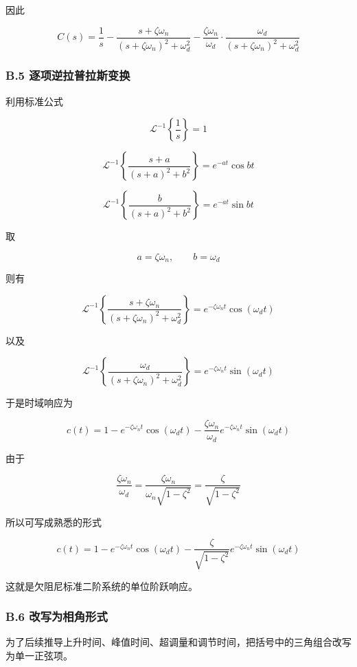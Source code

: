 \documentclass[
  11pt]{article}
\begin{document}
因此

\[
C(s)=\frac{1}{s}
-\frac{s+\zeta\omega_n}{(s+\zeta\omega_n)^2+\omega_d^2}
-\frac{\zeta\omega_n}{\omega_d}\cdot
\frac{\omega_d}{(s+\zeta\omega_n)^2+\omega_d^2}
\]

\subsubsection{B.5
逐项逆拉普拉斯变换}\label{b.5-ux9010ux9879ux9006ux62c9ux666eux62c9ux65afux53d8ux6362}

利用标准公式

\[
\mathcal{L}^{-1}\left\{\frac{1}{s}\right\}=1
\]

\[
\mathcal{L}^{-1}\left\{\frac{s+a}{(s+a)^2+b^2}\right\}=e^{-at}\cos bt
\]

\[
\mathcal{L}^{-1}\left\{\frac{b}{(s+a)^2+b^2}\right\}=e^{-at}\sin bt
\]

取

\[
a=\zeta\omega_n,\qquad b=\omega_d
\]

则有

\[
\mathcal{L}^{-1}\left\{
\frac{s+\zeta\omega_n}{(s+\zeta\omega_n)^2+\omega_d^2}
\right\}
=
e^{-\zeta\omega_n t}\cos(\omega_d t)
\]

以及

\[
\mathcal{L}^{-1}\left\{
\frac{\omega_d}{(s+\zeta\omega_n)^2+\omega_d^2}
\right\}
=
e^{-\zeta\omega_n t}\sin(\omega_d t)
\]

于是时域响应为

\[
c(t)=1-e^{-\zeta\omega_n t}\cos(\omega_d t)
-\frac{\zeta\omega_n}{\omega_d}e^{-\zeta\omega_n t}\sin(\omega_d t)
\]

由于

\[
\frac{\zeta\omega_n}{\omega_d}
=
\frac{\zeta\omega_n}{\omega_n\sqrt{1-\zeta^2}}
=
\frac{\zeta}{\sqrt{1-\zeta^2}}
\]

所以可写成熟悉的形式

\[
c(t)=1-e^{-\zeta\omega_n t}\cos(\omega_d t)
-\frac{\zeta}{\sqrt{1-\zeta^2}}e^{-\zeta\omega_n t}\sin(\omega_d t)
\]

这就是欠阻尼标准二阶系统的单位阶跃响应。

\subsubsection{B.6
改写为相角形式}\label{b.6-ux6539ux5199ux4e3aux76f8ux89d2ux5f62ux5f0f}

为了后续推导上升时间、峰值时间、超调量和调节时间，把括号中的三角组合改写为单一正弦项。
\end{document}
